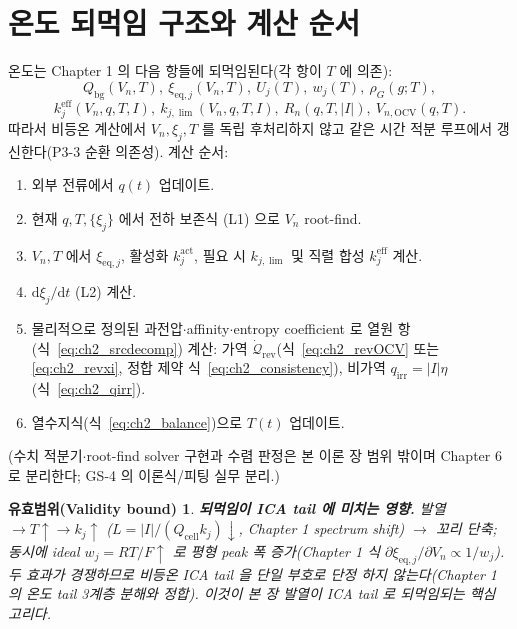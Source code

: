 \documentclass[11pt,a4paper]{article}
\newtheorem*{boundbox}{유효범위(Validity bound)}
\newcommand{\dd}{\mathrm{d}}
\newcommand{\eff}{\mathrm{eff}}
\newcommand{\eq}{\mathrm{eq}}
\newcommand{\bg}{\mathrm{bg}}
\newcommand{\cell}{\mathrm{cell}}
\newcommand{\OCV}{\mathrm{OCV}}
\newcommand{\irr}{\mathrm{irr}}
\newcommand{\rev}{\mathrm{rev}}
\begin{document}
\section{온도 되먹임 구조와 계산 순서}\label{sec:ch2_feedback}
온도는 Chapter 1 의 다음 항들에 되먹임된다(각 항이 $T$ 에 의존):
\begin{equation}
Q_\bg(V_n,T),\ \xi_{\eq,j}(V_n,T),\ U_j(T),\ w_j(T),\ \rho_G(g;T),
\label{eq:ch2_feedT1}
\end{equation}
\begin{equation}
k_j^{\eff}(V_n,q,T,I),\ k_{j,\lim}(V_n,q,T,I),\ R_n(q,T,|I|),\ V_{n,\OCV}(q,T).
\label{eq:ch2_feedT2}
\end{equation}
따라서 비등온 계산에서 $V_n,\xi_j,T$ 를 독립 후처리하지 않고 같은 시간 적분 루프에서 갱신한다(P3-3 순환
의존성). 계산 순서:
\begin{enumerate}[label=\arabic*),leftmargin=2.0em]
\item 외부 전류에서 $q(t)$ 업데이트.
\item 현재 $q,T,\{\xi_j\}$ 에서 전하 보존식 (L1) 으로 $V_n$ root-find.
\item $V_n,T$ 에서 $\xi_{\eq,j}$, 활성화 $k_j^{\mathrm{act}}$, 필요 시 $k_{j,\lim}$ 및 직렬 합성 $k_j^{\eff}$ 계산.
\item $\dd\xi_j/\dd t$ (L2) 계산.
\item 물리적으로 정의된 과전압$\cdot$affinity$\cdot$entropy coefficient 로 열원 항(식~\eqref{eq:ch2_srcdecomp}) 계산:
  가역 $\dot{\mathcal Q}_{\rev}$(식~\eqref{eq:ch2_revOCV} 또는 \eqref{eq:ch2_revxi}, 정합 제약 식~\eqref{eq:ch2_consistency}),
  비가역 $q_\irr=|I|\eta$(식~\eqref{eq:ch2_qirr}).
\item 열수지식(식~\eqref{eq:ch2_balance})으로 $T(t)$ 업데이트.
\end{enumerate}
(수치 적분기$\cdot$root-find solver 구현과 수렴 판정은 본 이론 장 범위 밖이며 Chapter 6 로 분리한다; GS-4 의
이론식/피팅 실무 분리.)
\begin{boundbox}
\textbf{되먹임이 ICA tail 에 미치는 영향.} 발열 $\to T\uparrow\to k_j\uparrow$ ($L=|I|/(Q_\cell k_j)\downarrow$,
Chapter 1 spectrum shift) $\to$ 꼬리 단축; 동시에 ideal $w_j=RT/F\uparrow$ 로 평형 peak 폭 증가(Chapter 1
식 $\partial\xi_{\eq,j}/\partial V_n\propto1/w_j$). 두 효과가 경쟁하므로 비등온 ICA tail 을 단일 부호로 단정
하지 않는다(Chapter 1 의 온도 tail 3계층 분해와 정합). 이것이 본 장 발열이 ICA tail 로 되먹임되는 핵심 고리다.
\end{boundbox}
\end{document}
